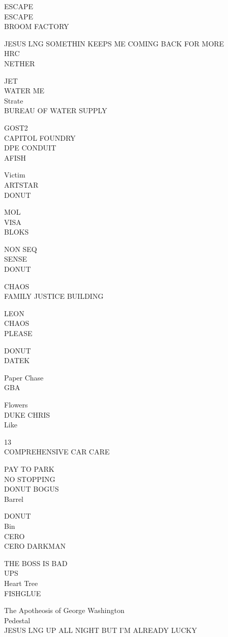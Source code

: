 \documentclass[10pt,letterpaper]{article}
\begin{document}
ESCAPE\\
ESCAPE\\
BROOM FACTORY

JESUS LNG SOMETHIN KEEPS ME COMING BACK FOR MORE\\
HRC\\
NETHER

JET\\
WATER ME\\
Strate\\
BUREAU OF WATER SUPPLY

GOST2\\
CAPITOL FOUNDRY\\
DPE CONDUIT\\
AFISH

Victim\\
ARTSTAR\\
DONUT

MOL\\
VISA\\
BLOKS

NON SEQ\\
SENSE\\
DONUT

CHAOS\\
FAMILY JUSTICE BUILDING

LEON\\
CHAOS\\
PLEASE

DONUT\\
DATEK

Paper Chase\\
GBA

Flowers\\
DUKE CHRIS\\
Like

13\\
COMPREHENSIVE CAR CARE

PAY TO PARK\\
NO STOPPING\\
DONUT BOGUS\\
Barrel

DONUT\\
Bin\\
CERO\\
CERO DARKMAN

THE BOSS IS BAD\\
UPS\\
Heart Tree\\
FISHGLUE

The Apotheosis of George Washington\\
Pedestal\\
JESUS LNG UP ALL NIGHT BUT I'M ALREADY LUCKY
\end{document}
